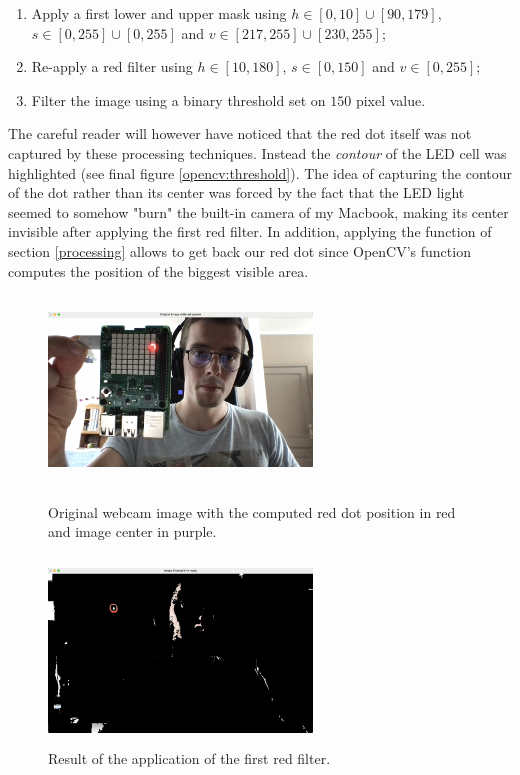 \begin{enumerate}
	\item Apply a first lower and upper mask using $h \in [0, 10] \cup [90,179] $,  $s \in [0, 255] \cup [0,255]$ and $v \in [217, 255] \cup [230,255]$;
	\item Re-apply a red filter using $h \in [10, 180] $,  $s \in [0, 150]$ and $v \in [0, 255]$;
	\item Filter the image using a binary threshold set on $150$ pixel value.
\end{enumerate}

The careful reader will however have noticed that the red dot itself was not captured by these processing techniques. Instead the \textit{contour} of the LED cell was highlighted (see final figure \ref{opencv:threshold}). The idea of capturing the contour of the dot rather than its center was forced by the fact that the LED light seemed to somehow "burn" the built-in camera of my Macbook, making its center invisible after applying the first red filter.  In addition, applying the \texttt{} function of section \ref{processing} allows to get back our red dot since OpenCV's \texttt{} function computes the position of the biggest visible area. 

\begin{figure}[H]

  \begin{minipage}[b]{0.45\linewidth}
   \centering
   \includegraphics[width=7cm,height=5cm]{Images/original.png}
   \caption{Original webcam image with the computed red dot position in red and image center in purple.}
   \label{opencv:original}
  \end{minipage}
\hfill
  \begin{minipage}[b]{0.45\linewidth}
   \centering
   \includegraphics[width=7cm,height=5cm]{Images/red_filter.png}
   \caption{Result of the application of the first red filter.}
   \label{opencv:red_filter}
  \end{minipage}
\end{figure}

